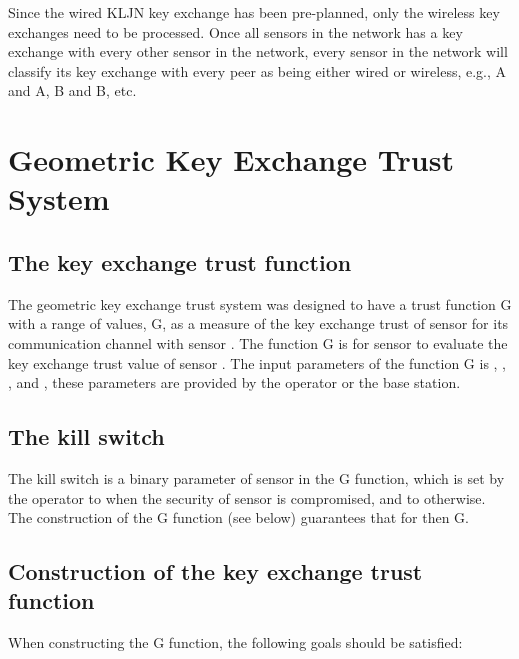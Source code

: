 \documentclass{ws-fnl2}
\begin{document}
Since the wired KLJN key exchange has been pre-planned, only the wireless key exchanges need to be processed. Once all sensors in the network has a key exchange with every other sensor in the network, every sensor in the network will classify its key exchange with every peer as being either wired or wireless, e.g., A and A, B and B, etc. 

\section{Geometric Key Exchange Trust System}

\subsection{The key exchange trust function}

The geometric key exchange trust system was designed to have a trust function G with a range of values, G, as a measure of the key exchange trust of sensor  for its communication channel with sensor . The function G is for sensor  to evaluate the key exchange trust value of sensor . The input parameters of the function G is , , , and , these parameters are provided by the operator or the base station. 

\subsection{The kill switch}

The kill switch  is a binary parameter of sensor  in the G function, which is set by the operator to  when the security of sensor  is compromised, and to  otherwise. The construction of the G function (see below) guarantees that for  then G.

\subsection{Construction of the key exchange trust function}

When constructing the G function, the following goals should be satisfied:
\end{document}
